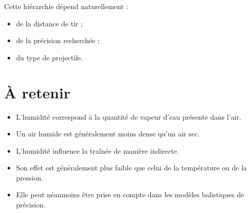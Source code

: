 Cette hiérarchie dépend naturellement :

\begin{itemize}
\item de la distance de tir ;
\item de la précision recherchée ;
\item du type de projectile.
\end{itemize}

\section{À retenir}

\begin{aretenir}

\begin{itemize}
\item L'humidité correspond à la quantité de vapeur d'eau présente dans
l'air.
\item Un air humide est généralement moins dense qu'un air sec.
\item L'humidité influence la traînée de manière indirecte.
\item Son effet est généralement plus faible que celui de la température
ou de la pression.
\item Elle peut néanmoins être prise en compte dans les modèles
balistiques de précision.
\end{itemize}

\end{aretenir}

